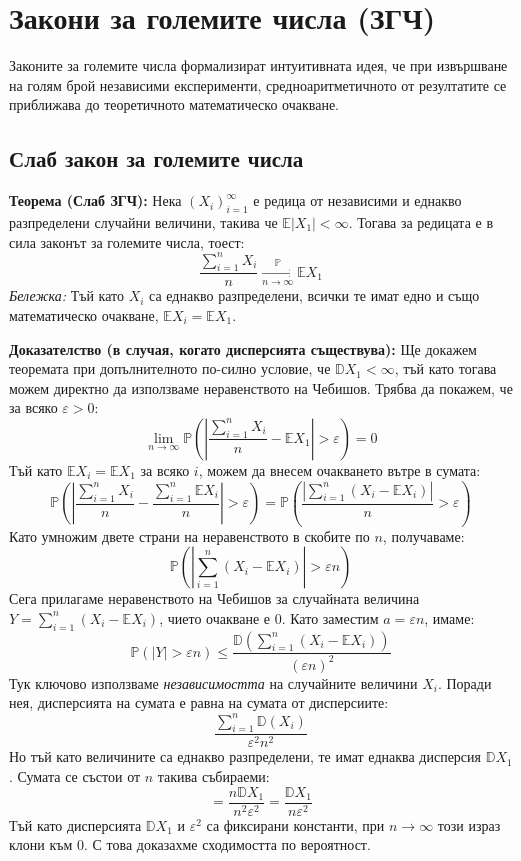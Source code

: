 \documentclass{article}
\begin{document}
\section{Закони за големите числа (ЗГЧ)}

Законите за големите числа формализират интуитивната идея, че при извършване на голям брой независими експерименти, средноаритметичното от резултатите се приближава до теоретичното математическо очакване.

\subsection{Слаб закон за големите числа}

\textbf{Теорема (Слаб ЗГЧ):} Нека $(X_i)_{i=1}^\infty$ е редица от независими и еднакво разпределени случайни величини, такива че $\mathbb{E}|X_1| < \infty$. Тогава за редицата е в сила законът за големите числа, тоест:
\[
\frac{\sum_{i=1}^n X_i}{n} \xrightarrow[n \to \infty]{\mathbb{P}} \mathbb{E} X_1
\]
\emph{Бележка:} Тъй като $X_i$ са еднакво разпределени, всички те имат едно и също математическо очакване, $\mathbb{E}X_i = \mathbb{E}X_1$.

\textbf{Доказателство (в случая, когато дисперсията съществува):}
Ще докажем теоремата при допълнителното по-силно условие, че $\mathbb{D}X_1 < \infty$, тъй като тогава можем директно да използваме неравенството на Чебишов.
Трябва да покажем, че за всяко $\varepsilon > 0$:
\[
\lim_{n \to \infty} \mathbb{P} \left( \left| \frac{\sum_{i=1}^n X_i}{n} - \mathbb{E} X_1 \right| > \varepsilon \right) = 0
\]
Тъй като $\mathbb{E}X_i = \mathbb{E}X_1$ за всяко $i$, можем да внесем очакването вътре в сумата:
\[
\mathbb{P} \left( \left| \frac{\sum_{i=1}^n X_i}{n} - \frac{\sum_{i=1}^n \mathbb{E}X_i}{n} \right| > \varepsilon \right) = \mathbb{P} \left( \frac{\left| \sum_{i=1}^n (X_i - \mathbb{E} X_i) \right|}{n} > \varepsilon \right)
\]
Като умножим двете страни на неравенството в скобите по $n$, получаваме:
\[
\mathbb{P} \left( \left| \sum_{i=1}^n (X_i - \mathbb{E} X_i) \right| > \varepsilon n \right)
\]
Сега прилагаме неравенството на Чебишов за случайната величина $Y = \sum_{i=1}^n (X_i - \mathbb{E} X_i)$, чието очакване е 0. Като заместим $a = \varepsilon n$, имаме:
\[
\mathbb{P}(|Y| > \varepsilon n) \le \frac{\mathbb{D} \left( \sum_{i=1}^n (X_i - \mathbb{E} X_i) \right)}{(\varepsilon n)^2}
\]
Тук ключово използваме \emph{независимостта} на случайните величини $X_i$. Поради нея, дисперсията на сумата е равна на сумата от дисперсиите:
\[
\frac{\sum_{i=1}^n \mathbb{D}(X_i)}{\varepsilon^2 n^2}
\]
Но тъй като величините са еднакво разпределени, те имат еднаква дисперсия $\mathbb{D}X_1$. Сумата се състои от $n$ такива събираеми:
\[
= \frac{n \mathbb{D}X_1}{n^2 \varepsilon^2} = \frac{\mathbb{D}X_1}{n \varepsilon^2}
\]
Тъй като дисперсията $\mathbb{D}X_1$ и $\varepsilon^2$ са фиксирани константи, при $n \to \infty$ този израз клони към $0$. С това доказахме сходимостта по вероятност.
\end{document}
